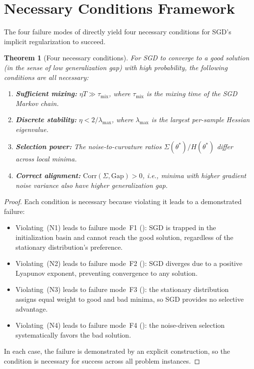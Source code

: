 \documentclass[11pt,a4paper]{article}
\newtheorem{theorem}{Theorem}[section]
\begin{document}
\section{Necessary Conditions Framework}
\label{sec:necessary}

The four failure modes of  directly yield four necessary
conditions for SGD's implicit regularization to succeed.

\begin{theorem}[Four necessary conditions]
\label{thm:necessary}
For SGD to converge to a good solution (in the sense of low generalization gap)
with high probability, the following conditions are all necessary:
\begin{enumerate}[label=\textup{\textbf{(N\arabic*)}},leftmargin=3em]
  \item \textbf{Sufficient mixing:}
        $\eta T \gg \tau_{\mathrm{mix}}$, where $\tau_{\mathrm{mix}}$ is the
        mixing time of the SGD Markov chain.
  \item \textbf{Discrete stability:}
        $\eta < 2/\lambda_{\max}$, where $\lambda_{\max}$ is the largest
        per-sample Hessian eigenvalue.
  \item \textbf{Selection power:}
        The noise-to-curvature ratios $\Sigma(\theta^*)/H(\theta^*)$ differ
        across local minima.
  \item \textbf{Correct alignment:}
        $\mathrm{Corr}(\Sigma, \mathrm{Gap}) > 0$, i.e., minima with higher
        gradient noise variance also have higher generalization gap.
\end{enumerate}
\end{theorem}

\begin{proof}
Each condition is necessary because violating it leads to a demonstrated
failure:
\begin{itemize}[nosep]
  \item Violating~(N1) leads to failure mode~F1 (): SGD is
        trapped in the initialization basin and cannot reach the good solution,
        regardless of the stationary distribution's preference.
  \item Violating~(N2) leads to failure mode~F2 (): SGD diverges
        due to a positive Lyapunov exponent, preventing convergence to any
        solution.
  \item Violating~(N3) leads to failure mode~F3 (): the
        stationary distribution assigns equal weight to good and bad minima,
        so SGD provides no selective advantage.
  \item Violating~(N4) leads to failure mode~F4 (): the
        noise-driven selection systematically favors the bad solution.
\end{itemize}
In each case, the failure is demonstrated by an explicit construction, so
the condition is necessary for success across all problem instances.
\end{proof}
\end{document}
